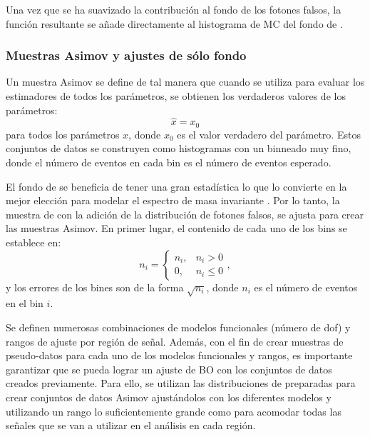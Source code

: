 Una vez que se ha suavizado la contribución al fondo de los fotones falsos, la función resultante se añade directamente al histograma de \ac{MC} del fondo de \gammajet.







\subsubsection{Muestras Asimov y ajustes de sólo fondo}
\label{subsubsec:bkg:modeling:preparation:asimov_bkgonly}

Un muestra Asimov se define de tal manera que cuando se utiliza para evaluar los estimadores de todos los parámetros, se obtienen los verdaderos valores de los parámetros:
\begin{equation}
    \hat{x} = x_0
\end{equation}
para todos los parámetros \(x\), donde \(x_0\) es el valor verdadero del parámetro. Estos conjuntos de datos se construyen como histogramas con un binneado muy fino, donde el número de eventos en cada bin es el número de eventos esperado.

El fondo de \gammajet se beneficia de tener una gran estadística lo que lo convierte en la mejor elección para modelar el espectro de masa invariante \gammajet. Por lo tanto, la muestra de \gammajet con la adición de la distribución de fotones falsos, se ajusta para crear las muestras Asimov. En primer lugar, el contenido de cada uno de los bins se establece en:
\begin{equation}
    n_i = 
    \begin{cases}
        n_i, & n_i > 0\\
        0, & n_i \leq 0
    \end{cases},
\end{equation}
y los errores de los bines son de la forma \(\sqrt{n_i}\), donde \(n_i\) es el número de eventos en el bin \(i\).


Se definen numerosas combinaciones de modelos funcionales (número de \ac{dof}) y rangos de ajuste por región de señal. Además, con el fin de crear muestras de pseudo-datos para cada uno de los modelos funcionales y rangos, es importante garantizar que se pueda lograr un ajuste de \ac{BO} con los conjuntos de datos creados previamente.
Para ello, se utilizan las distribuciones de \myj preparadas para crear conjuntos de datos Asimov ajustándolos con los diferentes modelos y utilizando un rango lo suficientemente grande como para acomodar todas las señales que se van a utilizar en el análisis en cada región.

